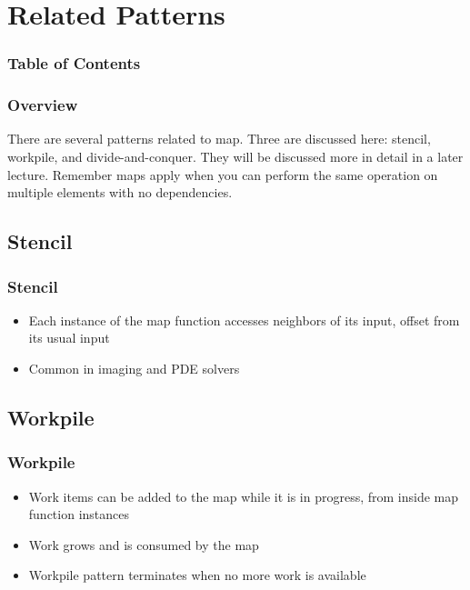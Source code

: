 \documentclass[xcolor=dvipsnames]{beamer}
\begin{document}
\section{Related Patterns} 

	\begin{frame} \frametitle{Table of Contents}
		\tableofcontents[currentsection]
	\end{frame} 
	
    \begin{frame} \frametitle{Overview}
        There are several patterns related to map. Three are discussed here:
        stencil, workpile, and divide-and-conquer. They will be discussed 
        more in detail in a later lecture. Remember maps apply when you can 
        perform the same operation on multiple elements with no dependencies.
    \end{frame}
	
	\subsection{Stencil}
        \begin{frame} \frametitle{Stencil}
            \begin{itemize}
                \item Each instance of the map function accesses neighbors of 
                its input, offset from its usual input
                \item Common in imaging and PDE solvers
            \end{itemize}
        \end{frame}

	\subsection{Workpile}
		\begin{frame} \frametitle{Workpile}
			\begin{itemize}
				\item Work items can be added to the map while it is in 
                progress, from inside map function instances
				\item Work grows and is consumed by the map
				\item Workpile pattern terminates when no more work is
                available 
			\end{itemize}
		\end{frame}
		
\end{document}
